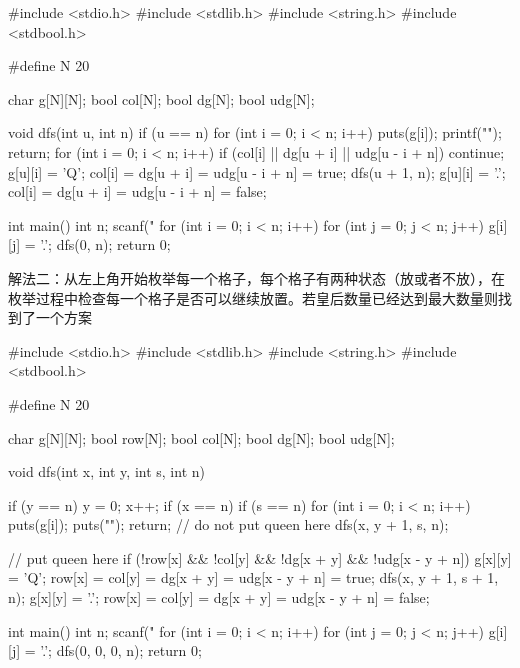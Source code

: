 \begin{mycpptwocol}
    #include <stdio.h>
    #include <stdlib.h>
    #include <string.h>
    #include <stdbool.h>

    #define N 20

    char g[N][N];
    bool col[N];
    bool dg[N];
    bool udg[N];

    void dfs(int u, int n) {
        if (u == n) {
            for (int i = 0; i < n; i++) {
                puts(g[i]);
            }
            printf("\n");
            return;
        }
        for (int i = 0; i < n; i++) {
            if (col[i] || dg[u + i] || udg[u - i + n]) {
                continue;
            }
            g[u][i] = 'Q';
            col[i] = dg[u + i] = udg[u - i + n] = true;
            dfs(u + 1, n);
            g[u][i] = '.';
            col[i] = dg[u + i] = udg[u - i + n] = false;
        }
    }

    int main() {
        int n;
        scanf("%
        for (int i = 0; i < n; i++) {
            for (int j = 0; j < n; j++) {
                g[i][j] = '.';
            }
        }
        dfs(0,  n);
        return 0;
    }
\end{mycpptwocol}

解法二：从左上角开始枚举每一个格子，每个格子有两种状态（放或者不放），在枚举过程中检查每一个格子是否可以继续放置。若皇后数量已经达到最大数量则找到了一个方案

\begin{mycpptwocol}
    #include <stdio.h>
    #include <stdlib.h>
    #include <string.h>
    #include <stdbool.h>

    #define N 20

    char g[N][N];
    bool row[N];
    bool col[N];
    bool dg[N];
    bool udg[N];

    void dfs(int x, int y, int s, int n) {
        if (y == n) {
            y = 0;
            x++;
        }
        if (x == n) {
            if (s == n) {
                for (int i = 0; i < n; i++) {
                    puts(g[i]);
                }
                puts("");
            }
            return;
        }
        // do not put queen here
        dfs(x, y + 1, s, n);

        // put queen here
        if (!row[x] && !col[y] && !dg[x + y] && !udg[x - y + n]) {
            g[x][y] = 'Q';
            row[x] = col[y] = dg[x + y] = udg[x - y + n] = true;
            dfs(x, y + 1, s + 1, n);
            g[x][y] = '.';
            row[x] = col[y] = dg[x + y] = udg[x - y + n] = false;
        }
    }

    int main() {
        int n;
        scanf("%
        for (int i = 0; i < n; i++) {
            for (int j = 0; j < n; j++) {
                g[i][j] = '.';
            }
        }
        dfs(0, 0, 0, n);
        return 0;
    }
\end{mycpptwocol}



